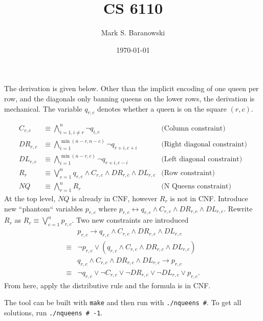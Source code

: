 \documentclass[paper=a4, fontsize=11pt]{scrartcl} %
\title{	
\normalfont \normalsize 
\textsc{CS 6110} \\ %
}
\author{Mark S. Baranowski} %
\date{\normalsize\today} %
\numberwithin{equation}{section} %
\numberwithin{figure}{section} %
\numberwithin{table}{section} %
\begin{document}
\maketitle %

The derivation is given below. Other than the implicit encoding of one queen per row, and the diagonals only banning queens on the lower rows, the derivation is mechanical. The variable $q_{r,c}$ denotes whether a queen is on the square $(r,c)$.

\begin{align*}
C_{r,c} & \equiv \bigwedge_{i=1, i \ne r}^n \neg q_{i,c} & \text{(Column constraint)}\\
DR_{r,c} & \equiv \bigwedge_{i=1}^{\min(n-r, n-c)}\neg q_{r+i, c+i} & \text{(Right diagonal constraint)}\\
DL_{r,c} & \equiv \bigwedge_{i=1}^{\min(n-r, c)}\neg q_{r+i, c-i} & \text{(Left diagonal constraint)}\\
R_{r} &\equiv \bigvee_{c=1}^n q_{r,c} \wedge C_{r,c}\wedge DR_{r,c} \wedge DL_{r,c} &\text{(Row constraint)}\\
NQ &\equiv \bigwedge_{r=1}^nR_r & \text{(N Queens constraint)}
\end{align*}
At the top level, $NQ$ is already in CNF, however $R_r$ is not in CNF. Introduce new ``phantom`` variables $p_{r,c}$ where
$p_{r,c}\leftrightarrow q_{r,c} \wedge C_{r,c}\wedge DR_{r,c} \wedge DL_{r,c}.$
Rewrite $R_r$ as $R_r \equiv \bigvee_{c=1}^n p_{r,c}.$
Two new constraints are introduced
\begin{align*}
&p_{r,c} \rightarrow q_{r,c} \wedge C_{r,c} \wedge DR_{r,c} \wedge DL_{r,c}\\
\equiv&\neg p_{r,c} \vee (q_{r,c} \wedge C_{r,c} \wedge DR_{r,c} \wedge DL_{r,c})\\
&q_{r,c} \wedge C_{r,c} \wedge DR_{r,c} \wedge DL_{r,c}\rightarrow p_{r,c}\\
\equiv&\neg q_{r,c} \vee \neg C_{r,c} \vee \neg DR_{r,c} \vee \neg DL_{r,c} \vee p_{r,c}.
\end{align*}
From here, apply the distributive rule and the formula is in CNF.

The tool can be built with {\tt make} and then run with {\tt ./nqueens \#}. To get all solutions, run {\tt ./nqueens \# -1}.
\end{document}
